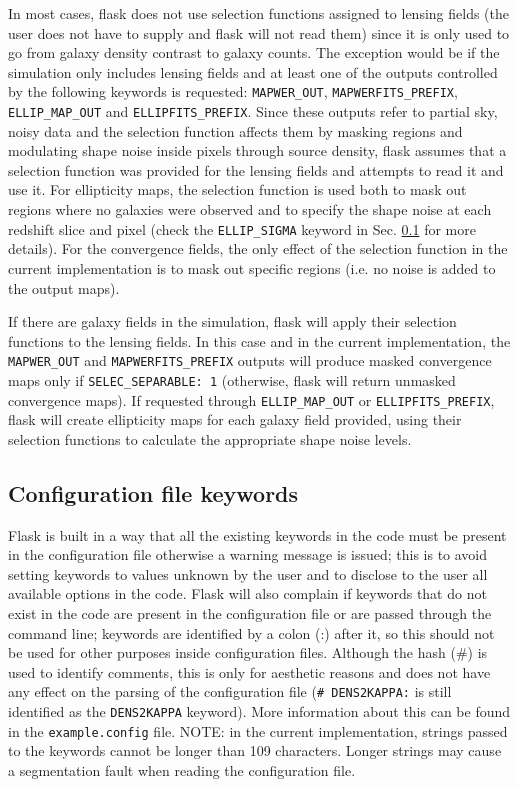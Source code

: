 \documentclass[12pt]{book} %
\begin{document}
In most cases, {\sc flask} does not use selection functions assigned to lensing fields 
(the user does not have to supply and {\sc flask} will not read them) since it 
is only used to go from galaxy density contrast to galaxy counts. The exception would be 
if the simulation only includes lensing fields and at least one of the outputs controlled by the 
following keywords is requested: {\tt MAPWER\_OUT}, {\tt MAPWERFITS\_PREFIX}, 
{\tt ELLIP\_MAP\_OUT} and {\tt ELLIPFITS\_PREFIX}. Since these outputs refer to partial 
sky, noisy data and the selection function affects them by masking regions and modulating 
shape noise inside pixels through source density, {\sc flask} assumes that a selection 
function was provided for the lensing fields and attempts to read it and use it. 
For ellipticity maps, the selection function is used both to mask out regions where no 
galaxies were observed and to specify the shape noise at each redshift slice and pixel
(check the {\tt ELLIP\_SIGMA} keyword in Sec. \ref{sec:keywords} for more details).
For the convergence fields, the only effect of the selection function in the current 
implementation is to mask out specific regions (i.e. no noise is added to the output maps). 

If there are galaxy fields in the simulation, {\sc flask} will apply their selection 
functions to the lensing fields. In this case and in the current implementation, 
the {\tt MAPWER\_OUT} and {\tt MAPWERFITS\_PREFIX} 
outputs will produce masked convergence maps only if {\tt SELEC\_SEPARABLE: 1} 
(otherwise, {\sc flask} will return unmasked convergence maps). If requested through 
{\tt ELLIP\_MAP\_OUT} or {\tt ELLIPFITS\_PREFIX}, {\sc flask} will create ellipticity 
maps for each galaxy field provided, using their selection functions to calculate the 
appropriate shape noise levels. 
 
  
\subsection{Configuration file keywords}
\label{sec:keywords}

{\sc Flask} is built in a way that all the existing keywords in the code must be present in the 
configuration file otherwise a warning message is issued; this is to avoid setting keywords to 
values unknown by the user and to disclose to the user all available options in the code. 
{\sc Flask} will also complain if keywords that do not exist in the code are present in the 
configuration file or are passed through the command line; keywords are identified by a colon (:) 
after it, so this should not be used for other purposes inside configuration files. Although 
the hash (\#) is used to identify comments, this is only for aesthetic reasons and does not have 
any effect on the parsing of the configuration file ({\tt \# DENS2KAPPA:} is still identified as 
the {\tt DENS2KAPPA} keyword). More information about this can be found in the {\tt example.config} 
file. 
NOTE: in the current implementation, strings passed to the keywords cannot be longer than 109 
characters. Longer strings may cause a segmentation fault when reading the configuration file. 
\end{document}
